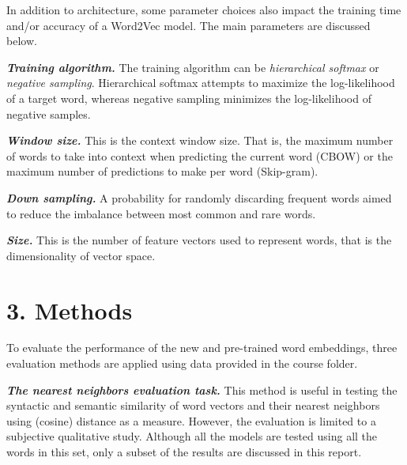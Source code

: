 \documentclass[12pt]{report}
\begin{document}
In addition to architecture, some parameter choices also impact the training time and/or accuracy of a Word2Vec model. The main parameters are discussed below.

\noindent \textbf{\emph{Training algorithm.}} The training algorithm can be \emph{hierarchical softmax}
or \emph{negative sampling}. Hierarchical softmax attempts to maximize the log-likelihood of a target word, whereas negative sampling minimizes the log-likelihood of negative samples.

\noindent \textbf{\emph{Window size.}} This is the context window size. That is, the maximum number of words to take into context when predicting the current word (CBOW) or the maximum number of predictions to make per word (Skip-gram).

\noindent \textbf{\emph{Down sampling.}} A probability for randomly discarding frequent words
aimed to reduce the imbalance between most common and rare words.

\noindent \textbf{\emph{Size.}} This is the number of feature vectors used to represent words, that is the dimensionality of vector space.

\section*{3. Methods}
To evaluate the performance of the new and pre-trained word embeddings, three evaluation methods are applied using data provided in the course folder.

\noindent \textbf{\emph{The nearest neighbors evaluation task.}} This method is useful in testing the syntactic and semantic similarity of word vectors and their nearest neighbors using (cosine) distance
as a measure. However, the evaluation is limited to a subjective qualitative study. Although all the models are tested using all the words in this set, only a subset of the results are discussed in this report.
\end{document}
